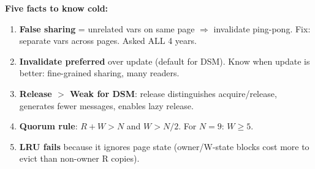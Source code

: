 \documentclass[12pt,a4paper]{article}
\begin{document}
\textbf{Five facts to know cold:}
\begin{enumerate}[noitemsep]
  \item \textbf{False sharing} = unrelated vars on same page $\Rightarrow$ invalidate ping-pong. Fix: separate vars across pages. Asked ALL 4 years.
  \item \textbf{Invalidate preferred} over update (default for DSM). Know when update is better: fine-grained sharing, many readers.
  \item \textbf{Release $>$ Weak for DSM}: release distinguishes acquire/release, generates fewer messages, enables lazy release.
  \item \textbf{Quorum rule}: $R + W > N$ and $W > N/2$. For $N=9$: $W \geq 5$.
  \item \textbf{LRU fails} because it ignores page state (owner/W-state blocks cost more to evict than non-owner R copies).
\end{enumerate}
\end{document}
